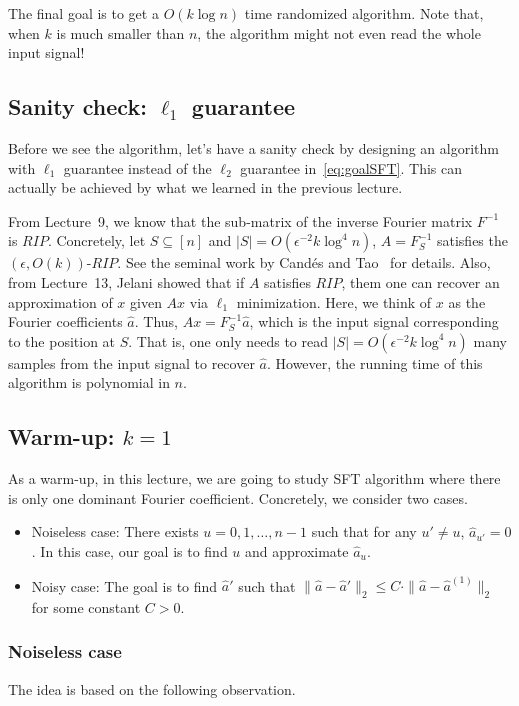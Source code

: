 \documentclass[11pt]{article}
\begin{document}
The final goal is to get a $O(k\log n)$ time randomized algorithm. Note that, when $k$ is much smaller than $n$, the algorithm might not even read the whole input signal!

\subsection{Sanity check: $\ell_1$ guarantee}\label{sec:SFT-l1}
Before we see the algorithm, let's have a sanity check by designing an algorithm with $\ell_1$ guarantee instead of the $\ell_2$ guarantee in~\eqref{eq:goalSFT}. This can actually be achieved by what we learned in the previous lecture.

From Lecture~9, we know that the sub-matrix of the inverse Fourier matrix $F^{-1}$ is $RIP$. Concretely, let $S\subseteq[n]$ and $|S|=O(\epsilon^{-2}k\log^4n)$, $A=F^{-1}_S$ satisfies the $(\epsilon,O(k))$-$RIP$. See the seminal work by Cand\'{e}s and Tao~\cite{CandesT06} for details. Also, from Lecture~13, Jelani showed that if $A$ satisfies $RIP$, them one can recover an approximation of $x$ given $Ax$ via $\ell_1$ minimization. Here, we think of $x$ as the Fourier coefficients $\hat{a}$. Thus, $Ax=F^{-1}_S\hat{a}$, which is the input signal corresponding to the position at $S$. That is, one only needs to read $|S|=O(\epsilon^{-2}k\log^4n)$ many samples from the input signal to recover $\hat{a}$. However, the running time of this algorithm is polynomial in $n$.


\subsection{Warm-up: $k=1$}\label{sec:SFT-k=1}
As a warm-up, in this lecture, we are going to study SFT algorithm where there is only one dominant Fourier coefficient. Concretely, we consider two cases.
\begin{itemize}
	\item Noiseless case: There exists $u=0,1,\dots,n-1$ such that for any $u'\neq u$, $\hat{a}_{u'}=0$. In this case, our goal is to find $u$ and approximate $\hat{a}_u$.
	\item Noisy case: The goal is to find $\hat{a}'$ such that $\|\hat{a}-\hat{a}'\|_2\leq C\cdot\|\hat{a}-\hat{a}^{(1)}\|_2$ for some constant $C>0$.
\end{itemize}

\subsubsection{Noiseless case}
The idea is based on the following observation.
\end{document}
